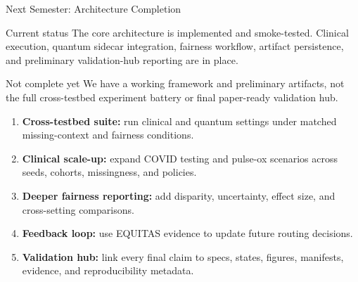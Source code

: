 \begin{frame}{Next Semester: Architecture Completion}
\small
\begin{block}{Current status}
The core architecture is implemented and smoke-tested. Clinical execution, quantum sidecar integration, fairness workflow, artifact persistence, and preliminary validation-hub reporting are in place.
\end{block}

\vspace{-0.05cm}

\begin{block}{Not complete yet}
We have a working framework and preliminary artifacts, not the full cross-testbed experiment battery or final paper-ready validation hub.
\end{block}

\vspace{0.1cm}

\begin{enumerate}\small
    \item \textbf{Cross-testbed suite:} run clinical and quantum settings under matched missing-context and fairness conditions.
    \item \textbf{Clinical scale-up:} expand COVID testing and pulse-ox scenarios across seeds, cohorts, missingness, and policies.
    \item \textbf{Deeper fairness reporting:} add disparity, uncertainty, effect size, and cross-setting comparisons.
    \item \textbf{Feedback loop:} use EQUITAS evidence to update future routing decisions.
    \item \textbf{Validation hub:} link every final claim to specs, states, figures, manifests, evidence, and reproducibility metadata.
\end{enumerate}
\end{frame}
